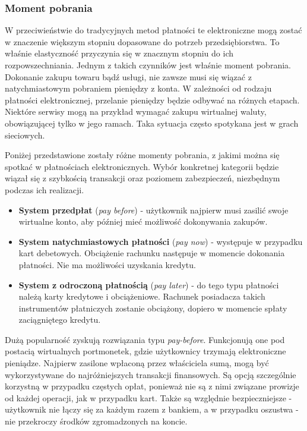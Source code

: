 \subsubsection*{Moment pobrania}
W przeciwieństwie do tradycyjnych metod płatności te elektroniczne mogą zostać w znaczenie większym stopniu dopasowane do potrzeb przedsiębiorstwa. To właśnie  elastyczność przyczynia się w znacznym stopniu do ich rozpowszechniania. Jednym z takich czynników jest właśnie moment pobrania. Dokonanie zakupu towaru bądź usługi, nie zawsze musi się wiązać z natychmiastowym pobraniem pieniędzy z konta. W zależności od rodzaju płatności elektronicznej, przelanie pieniędzy będzie odbywać na różnych etapach. Niektóre serwisy mogą na przykład wymagać zakupu wirtualnej waluty, obowiązującej tylko w jego ramach. Taka sytuacja często spotykana jest w grach sieciowych. 

Poniżej przedstawione zostały różne momenty pobrania, z jakimi można się spotkać w płatnościach elektronicznych. Wybór konkretnej kategorii będzie wiązał się z szybkością transakcji oraz poziomem zabezpieczeń, niezbędnym podczas ich realizacji.
\begin{itemize}
	\item \textbf{System przedpłat} (\textit{pay before}) - użytkownik najpierw musi zasilić swoje wirtualne konto, aby później mieć możliwość dokonywania zakupów.
	\item \textbf{System natychmiastowych płatności} (\textit{pay now}) - występuje w przypadku kart debetowych. Obciążenie rachunku następuje w momencie dokonania płatności. Nie ma możliwości uzyskania kredytu.
	\item \textbf{System z odroczoną płatnością} (\textit{pay later}) - do tego typu płatności należą karty kredytowe i obciążeniowe. Rachunek posiadacza takich instrumentów płatniczych zostanie obciążony, dopiero w momencie spłaty zaciągniętego kredytu.
\end{itemize}
Dużą popularność zyskują rozwiązania typu \textit{pay-before}. Funkcjonują one pod postacią wirtualnych portmonetek, gdzie użytkownicy trzymają elektroniczne pieniądze. Najpierw zasilone wpłaconą przez właściciela sumą, mogą być wykorzystywane do najróżniejszych transakcji finansowych. Są opcją szczególnie korzystną w przypadku częstych opłat, ponieważ nie są z nimi związane prowizje od każdej operacji, jak w przypadku kart. Także są względnie bezpieczniejsze - użytkownik nie łączy się za każdym razem z bankiem, a w przypadku oszustwa - nie przekroczy środków zgromadzonych na koncie.

